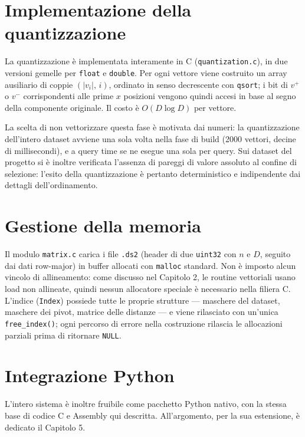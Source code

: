 \section{Implementazione della quantizzazione}
La quantizzazione è implementata interamente in C (\texttt{quantization.c}), in due versioni gemelle per \texttt{float} e \texttt{double}. Per ogni vettore viene costruito un array ausiliario di coppie $(|v_i|,\, i)$, ordinato in senso decrescente con \texttt{qsort}; i bit di $v^+$ o $v^-$ corrispondenti alle prime $x$ posizioni vengono quindi accesi in base al segno della componente originale. Il costo è $O(D \log D)$ per vettore.

La scelta di non vettorizzare questa fase è motivata dai numeri: la quantizzazione dell'intero dataset avviene una sola volta nella fase di build (2000 vettori, decine di millisecondi), e a query time se ne esegue una sola per query. Sui dataset del progetto si è inoltre verificata l'assenza di pareggi di valore assoluto al confine di selezione: l'esito della quantizzazione è pertanto deterministico e indipendente dai dettagli dell'ordinamento.

\section{Gestione della memoria}
Il modulo \texttt{matrix.c} carica i file \texttt{.ds2} (header di due \texttt{uint32} con $n$ e $D$, seguito dai dati row-major) in buffer allocati con \texttt{malloc} standard. Non è imposto alcun vincolo di allineamento: come discusso nel Capitolo 2, le routine vettoriali usano load non allineate, quindi nessun allocatore speciale è necessario nella filiera C. L'indice (\texttt{Index}) possiede tutte le proprie strutture — maschere del dataset, maschere dei pivot, matrice delle distanze — e viene rilasciato con un'unica \texttt{free\_index()}; ogni percorso di errore nella costruzione rilascia le allocazioni parziali prima di ritornare \texttt{NULL}.

\section{Integrazione Python}
L'intero sistema è inoltre fruibile come pacchetto Python nativo, con la stessa base di codice C e Assembly qui descritta. All'argomento, per la sua estensione, è dedicato il Capitolo 5.
